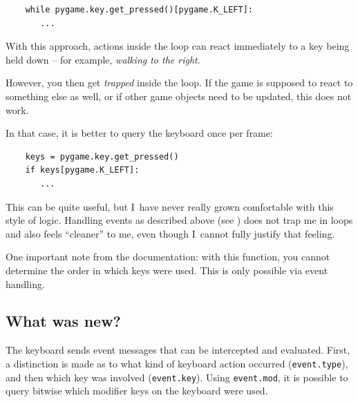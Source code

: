\lstset{firstnumber=1}
\begin{lstlisting}
	while pygame.key.get_pressed()[pygame.K_LEFT]:
	   ...
\end{lstlisting}

With this approach, actions inside the loop can react immediately to a key being held down -- for example, \emph{walking to the right}. 

\begin{warningbox}
	However, you then get \emph{trapped} inside the loop. If the game is supposed to react to something else as well, or if other game objects need to be updated, this does not work. 
\end{warningbox}

\newpage
In that case, it is better to query the keyboard once per frame:
\lstset{firstnumber=1}
\begin{lstlisting}
	keys = pygame.key.get_pressed()
	if keys[pygame.K_LEFT]:
	   ...
\end{lstlisting}

This can be quite useful, but I~have never really grown comfortable with this style of logic. Handling events as described above (see ) does not trap me in loops and also feels ``cleaner'' to me, even though I~cannot fully justify that feeling.

One important note from the documentation: with this function, you cannot determine the order in which keys were used. This is only possible via event handling.


\subsection*{What was new?}
\begin{hintbox}
	The keyboard sends event messages that can be intercepted and evaluated. First, a distinction is made as to what kind of keyboard action occurred (\texttt{event.type}), and then which key was involved (\texttt{event.key}). Using \texttt{event.mod}, it is possible to query bitwise which modifier keys on the keyboard were used.
\end{hintbox}


